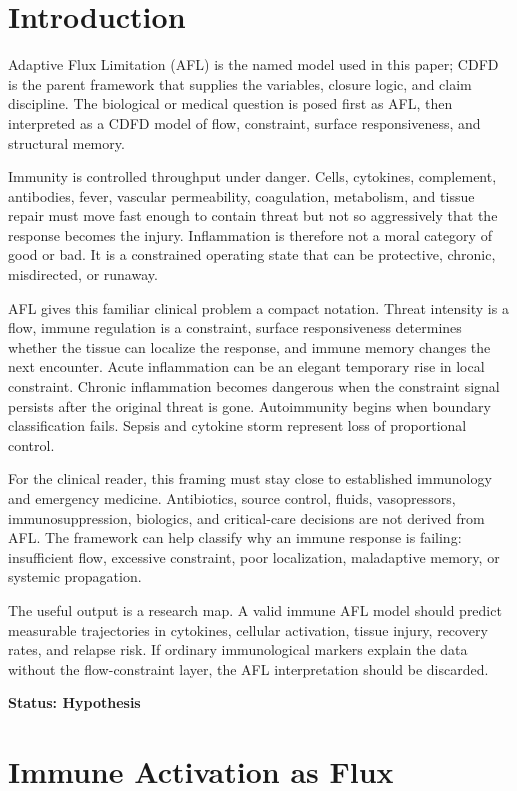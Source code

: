 \documentclass[12pt,a4paper]{article}
\begin{document}
\section{Introduction}

Adaptive Flux Limitation (AFL) is the named model used in this paper; CDFD is the parent framework that supplies the variables, closure logic, and claim discipline. The biological or medical question is posed first as AFL, then interpreted as a CDFD model of flow, constraint, surface responsiveness, and structural memory.

Immunity is controlled throughput under danger. Cells, cytokines, complement, antibodies, fever, vascular permeability, coagulation, metabolism, and tissue repair must move fast enough to contain threat but not so aggressively that the response becomes the injury. Inflammation is therefore not a moral category of good or bad. It is a constrained operating state that can be protective, chronic, misdirected, or runaway.

AFL gives this familiar clinical problem a compact notation. Threat intensity is a flow, immune regulation is a constraint, surface responsiveness determines whether the tissue can localize the response, and immune memory changes the next encounter. Acute inflammation can be an elegant temporary rise in local constraint. Chronic inflammation becomes dangerous when the constraint signal persists after the original threat is gone. Autoimmunity begins when boundary classification fails. Sepsis and cytokine storm represent loss of proportional control.

For the clinical reader, this framing must stay close to established immunology and emergency medicine. Antibiotics, source control, fluids, vasopressors, immunosuppression, biologics, and critical-care decisions are not derived from AFL. The framework can help classify why an immune response is failing: insufficient flow, excessive constraint, poor localization, maladaptive memory, or systemic propagation.

The useful output is a research map. A valid immune AFL model should predict measurable trajectories in cytokines, cellular activation, tissue injury, recovery rates, and relapse risk. If ordinary immunological markers explain the data without the flow-constraint layer, the AFL interpretation should be discarded.

\textbf{Status: Hypothesis}

\section{Immune Activation as Flux}
\end{document}
